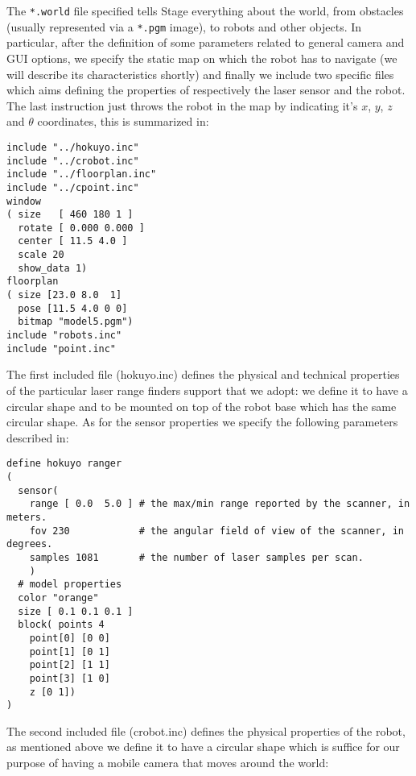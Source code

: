 The \texttt{*.world} file specified tells Stage everything about the world,
from obstacles (usually represented via a \texttt{*.pgm} image), to robots and other 
objects. In particular, after the definition of some parameters related to general 
camera and GUI options, we specify the static map on which the robot has to navigate 
(we will describe its characteristics shortly) and finally we include two specific 
files which aims defining the properties of respectively the laser sensor and the robot.
The last instruction just throws the robot in the map by indicating it's $x$, $y$, $z$
and $\theta$ coordinates, this is summarized in:
\begin{lstlisting}
include "../hokuyo.inc"
include "../crobot.inc"
include "../floorplan.inc"
include "../cpoint.inc"
window
( size   [ 460 180 1 ]         
  rotate [ 0.000 0.000 ]    
  center [ 11.5 4.0 ]   
  scale 20
  show_data 1)
floorplan
( size [23.0 8.0  1] 
  pose [11.5 4.0 0 0]
  bitmap "model5.pgm")
include "robots.inc"
include "point.inc"
\end{lstlisting}
The first included file (hokuyo.inc) defines the physical and technical
properties of the particular laser range finders support that we adopt: we
define it to have a circular shape and to be mounted on top of the robot base
which has the same circular shape. As for the sensor properties we specify
the following parameters described in:
\begin{lstlisting}
define hokuyo ranger
(
  sensor(           
    range [ 0.0  5.0 ] # the max/min range reported by the scanner, in meters.
    fov 230            # the angular field of view of the scanner, in degrees.
    samples 1081       # the number of laser samples per scan.
    )
  # model properties
  color "orange"
  size [ 0.1 0.1 0.1 ]
  block( points 4
    point[0] [0 0]
    point[1] [0 1]
    point[2] [1 1]
    point[3] [1 0]
    z [0 1])
)
\end{lstlisting}
The second included file (crobot.inc) defines the physical properties of
the robot, as mentioned above we define it to have a circular shape which
is suffice for our purpose of having a mobile camera that moves around the world:
